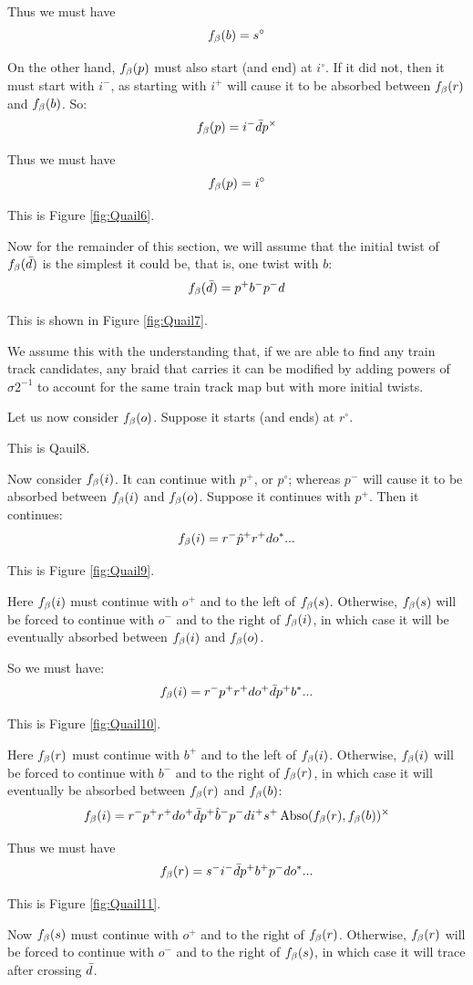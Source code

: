Thus we must have
\[
f_\beta(b) = s^\circ
\]

On the other hand, $f_\beta(p)$ must also start (and end) at $i^\circ$. If it did not, then it must start with $i^-$, as starting with $i^+$ will cause it to be absorbed between $f_\beta(r)$ and $f_\beta(b)$. So:
\[
f_\beta(p) = i^- \bar{d} p^\times
\]

Thus we must have
\[
f_\beta(p) = i^\circ
\]

This is Figure \ref{fig:Quail6}.

Now for the remainder of this section, we will assume that the initial twist of $f_\beta(\bar{d})$ is the simplest it could be, that is, one twist with $b$:
\[
f_\beta(\bar{d}) = p^+ b^- p^- d
\]

This is shown in Figure \ref{fig:Quail7}.

We assume this with the understanding that, if we are able to find any train track candidates, any braid that carries it can be modified by adding powers of $\sigma2^{-1}$ to account for the same train track map but with more initial twists.


Let us now consider $f_\beta(o)$. Suppose it starts (and ends) at $r^\circ$.

This is Qauil8.

Now consider $f_\beta(i)$. It can continue with $p^+$, or $p^\circ$; whereas $p^-$ will cause it to be absorbed between $f_\beta(i)$ and $f_\beta(o)$. Suppose it continues with $p^+$. Then it continues:
\[
f_\beta(i) = r^- \hat{p}^+r^+ d o^*...
\]

This is Figure \ref{fig:Quail9}.

Here $f_\beta(i)$ must continue with $o^+$ and to the left of $f_\beta(s)$. Otherwise, $f_\beta(s)$ will be forced to continue with $o^-$ and to the right of $f_\beta(i)$, in which case it will be eventually absorbed between $f_\beta(i)$ and $f_\beta(o)$.

So we must have:
\[
f_\beta(i) = r^- p^+r^+ d o^+ \bar{d} p^+ b^*...
\]

This is Figure \ref{fig:Quail10}.

Here $f_\beta(r)$ must continue with $b^+$ and to the left of $f_\beta(i)$. Otherwise, $f_\beta(i)$ will be forced to continue with $b^-$ and to the right of $f_\beta(r)$, in which case it will eventually be absorbed between $f_\beta(r)$ and $f_\beta(b)$:
\[
f_\beta(i) = r^- p^+ r^+ d o^+ \bar{d} p^+ \hat{b}^- p^- d i^+ s^+ \operatorname{Abso}(f_\beta(r), f_\beta(b))^\times
\]

Thus we must have
\[
f_\beta(r) = s^- i^- \bar{d} p^+ b^+ p^- d o^*...
\]

This is Figure \ref{fig:Quail11}.

Now $f_\beta(s)$ must continue with $o^+$ and to the right of $f_\beta(r)$. Otherwise, $f_\beta(r)$ will be forced to continue with $o^-$ and to the right of $f_\beta(s)$, in which case it will trace after crossing $\bar{d}$.

